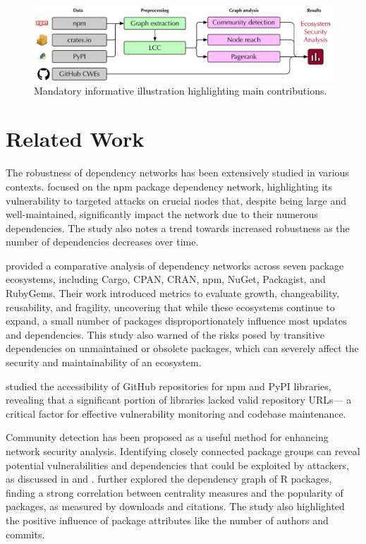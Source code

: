 \documentclass[9pt,twocolumn,twoside]{pnas-report}
\begin{document}
\begin{figure}
	\centering
	\includegraphics[width=1\linewidth]{topdown.pdf}
	\caption{Mandatory informative illustration highlighting main contributions.}
	\label{fig:topdown}
\end{figure}
\section*{Related Work}

The robustness of dependency networks has been extensively studied in various contexts. \cite{hafner2021robustness} focused on the npm package dependency network, highlighting its vulnerability to targeted attacks on crucial nodes that, despite being large and well-maintained, significantly impact the network due to their numerous dependencies. The study also notes a trend towards increased robustness as the number of dependencies decreases over time.

\cite{decan2018evolution} provided a comparative analysis of dependency networks across seven package ecosystems, including Cargo, CPAN, CRAN, npm, NuGet, Packagist, and RubyGems. Their work introduced metrics to evaluate growth, changeability, reusability, and fragility, uncovering that while these ecosystems continue to expand, a small number of packages disproportionately influence most updates and dependencies. This study also warned of the risks posed by transitive dependencies on unmaintained or obsolete packages, which can severely affect the security and maintainability of an ecosystem.

\cite{tsakpinis2024accessibility} studied the accessibility of GitHub repositories for npm and PyPI libraries, revealing that a significant portion of libraries lacked valid repository URLs— a critical factor for effective vulnerability monitoring and codebase maintenance.

Community detection has been proposed as a useful method for enhancing network security analysis. Identifying closely connected package groups can reveal potential vulnerabilities and dependencies that could be exploited by attackers, as discussed in \cite{hafner2021robustness} and \cite{tsakpinis2024accessibility}. \cite{korkmazrpackages} further explored the dependency graph of R packages, finding a strong correlation between centrality measures and the popularity of packages, as measured by downloads and citations. The study also highlighted the positive influence of package attributes like the number of authors and commits.
\end{document}
